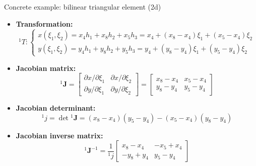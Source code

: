 \documentclass[aspectratio=169]{beamer}
\begin{document}
{  \begin{frame}{Concrete example: bilinear triangular element (2d)}
      \begin{itemize}
          \item\textbf{Transformation:}
                $${}^1T:\begin{cases*}
                        x(\xi_1,\xi_2) =  x_4 h_1 + x_8 h_2 + x_5 h_3  = x_4+(x_8-x_4)\xi_1+(x_5-x_4)\xi_2 \\
                        y(\xi_1,\xi_2)=  y_4 h_1 + y_8 h_2 + y_5 h_3 = y_4+(y_8-y_4)\xi_1+(y_5-y_4)\xi_2
                    \end{cases*}$$
          \item \textbf{Jacobian matrix:}
                $${}^1\mathbf J=\begin{bmatrix}
                        \partial x/\partial \xi_1 & \partial x/\partial \xi_2 \\
                        \partial y/\partial \xi_1 & \partial y/\partial \xi_2
                    \end{bmatrix}=\begin{bmatrix}
                        x_8-x_4 & x_5-x_4 \\
                        y_8-y_4 & y_5-y_4
                    \end{bmatrix}$$
          \item\textbf{Jacobian determinant:} $${}^1j=\det{{}^1\mathbf J}=(x_8-x_4)( y_5-y_4)-(x_5-x_4)( y_8-y_4)$$
          \item \textbf{Jacobian inverse matrix:}
                $${}^1\mathbf J^{-1}=\frac{1}{{}^1j}\begin{bmatrix}
                        x_8-x_4  & -x_5+x_4 \\
                        -y_8+y_4 & y_5-y_4
                    \end{bmatrix}$$
      \end{itemize}
  \end{frame}

}
\end{document}
